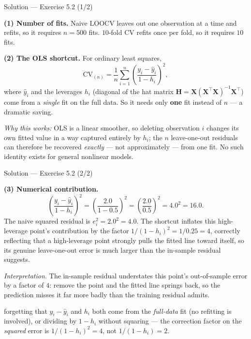 \documentclass[aspectratio=169,11pt]{beamer}
\begin{document}
\begin{frame}{Solution --- Exercise 5.2 (1/2)}
  \begin{solutionbox}
    \textbf{(1) Number of fits.}
    Naive LOOCV leaves out one observation at a time and refits, so it
    requires $n = 500$ fits. $10$-fold CV refits once per fold, so it
    requires $10$ fits.

    \textbf{(2) The OLS shortcut.}
    For ordinary least squares,
    \[
      \mathrm{CV}_{(n)} = \frac{1}{n}\sum_{i=1}^n
        \left(\frac{y_i - \hat y_i}{1 - h_i}\right)^2 ,
    \]
    where $\hat y_i$ and the leverages $h_i$ (diagonal of the hat matrix
    $\mathbf{H} = \mathbf{X}(\mathbf{X}^\top\mathbf{X})^{-1}\mathbf{X}^\top$)
    come from a \emph{single} fit on the full data. So it needs only
    \textbf{one} fit instead of $n$ --- a dramatic saving.

    \emph{Why this works:} OLS is a linear smoother, so deleting
    observation $i$ changes its own fitted value in a way captured
    entirely by $h_i$; the $n$ leave-one-out residuals can therefore be
    recovered \emph{exactly} --- not approximately --- from one fit. No
    such identity exists for general nonlinear models.
  \end{solutionbox}
\end{frame}

\begin{frame}{Solution --- Exercise 5.2 (2/2)}
  \begin{solutionbox}
    \textbf{(3) Numerical contribution.}
    \[
      \left(\frac{y_i - \hat y_i}{1 - h_i}\right)^2
      = \left(\frac{2.0}{1 - 0.5}\right)^2
      = \left(\frac{2.0}{0.5}\right)^2
      = 4.0^2 = 16.0 .
    \]
    The naive squared residual is $e_i^2 = 2.0^2 = 4.0$. The shortcut
    inflates this high-leverage point's contribution by the factor
    $1/(1-h_i)^2 = 1/0.25 = 4$, correctly reflecting that a
    high-leverage point strongly pulls the fitted line toward itself, so
    its genuine leave-one-out error is much larger than the in-sample
    residual suggests.

    \emph{Interpretation.} The in-sample residual understates this
    point's out-of-sample error by a factor of $4$: remove the point and
    the fitted line springs back, so the prediction misses it far more
    badly than the training residual admits.
  \end{solutionbox}
  \begin{mistake}
    forgetting that $y_i - \hat y_i$ and $h_i$
    both come from the \emph{full-data} fit (no refitting is involved),
    or dividing by $1-h_i$ without squaring --- the correction factor on
    the \emph{squared} error is $1/(1-h_i)^2 = 4$, not $1/(1-h_i) = 2$.
  \end{mistake}
\end{frame}
\end{document}
